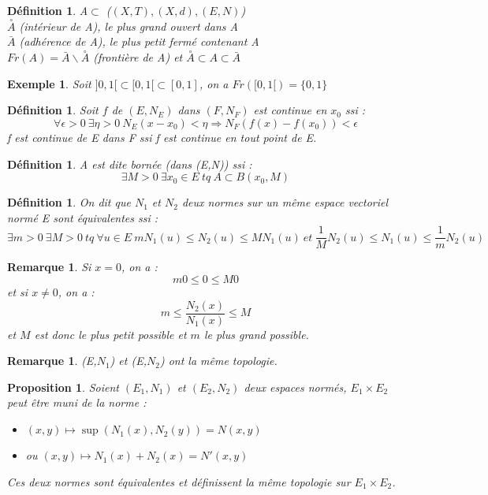 \documentclass[a4paper, oneside]{report}
\theoremstyle{break}
\newtheorem{defi}[thm]{Définition}
\newtheorem{propo}[thm]{Proposition}
\newtheorem{exem}[thm]{Exemple}
\newtheorem{remar}[thm]{Remarque}
\newcommand{\x}{\times}
\newcommand{\evn}{espace vectoriel normé }
\newcommand{\fracun}[1]{\frac{1}{#1}}
\newcommand{\cerc}[1]{\overset{\circ}{#1}}
\begin{document}
\begin{defi}                    
A$\subset$ ($(X,T), (X,d), (E,N)$)\\
$\cerc{A}$ (intérieur de A), le plus grand ouvert dans A\\
$\bar{A}$ (adhérence de A), le plus petit fermé contenant A\\
$Fr(A)= \bar{A} \backslash \cerc{A}$ (frontière de A) et $\cerc{A}\subset A \subset \bar{A}$\\
\end{defi}

\begin{exem}
Soit $]0,1[ \subset [0,1[ \subset [0,1]$, on a $Fr([0,1[)=\{0,1\}$
\end{exem}


\begin{defi}                    

Soit $f$ de $(E,N_E)$ dans $(F,N_F)$ est continue en $x_0$ ssi :
$$\forall\epsilon >0~\exists \eta>0~N_E(x-x_0)< \eta \Rightarrow N_F(f(x)-f(x_0))<\epsilon$$
f est continue de E dans F ssi f est continue en tout point de E.
\end{defi}

\begin{defi}                    
A est dite bornée (dans (E,N)) ssi :
$$\exists M>0~\exists x_0 \in E~tq~A\subset B(x_0,M)$$
\end{defi}

\begin{defi}                    
On dit que $N_1$ et $N_2$ deux normes sur un même \evn E sont équivalentes ssi :
$$\exists m>0~ \exists M>0~tq~\forall u\in E~mN_1(u)\leq N_2(u)\leq MN_1(u)~et~\fracun{M}N_2(u)\leq N_1(u)\leq \fracun{m}N_2(u)$$
\end{defi}

\begin{remar}
Si $x=0$, on a :
$$m0\leq 0 \leq M0$$
et si $x\neq 0$, on a :
$$m \leq \frac{N_2(x)}{N_1(x)} \leq M$$
et $M$ est donc le plus petit possible et $m$ le plus grand possible.
\end{remar}



\begin{remar}
(E,$N_1$) et (E,$N_2$) ont la même topologie.
\end{remar}


\begin{propo}
Soient $(E_1,N_1)$ et $(E_2,N_2)$ deux espaces normés, $E_1 \x E_2$ peut être muni de la norme :
\begin{itemize}
\item $(x,y) \mapsto \sup (N_1(x), N_2(y))=N(x,y)$
\item ou $(x,y) \mapsto N_1(x)+N_2(x)=N'(x,y)$
\end{itemize}
Ces deux normes sont équivalentes et définissent la même topologie sur $E_1\x E_2$.
\end{propo}
\end{document}
